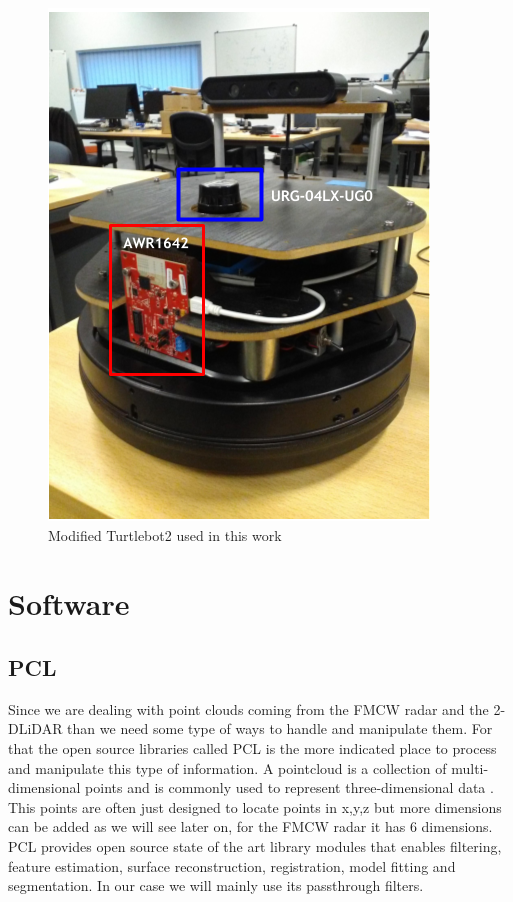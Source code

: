 \begin{figure}[h] 
\centerline{\includegraphics [width=0.5 \textwidth]{imgs/chapter4/turtlebot2.PNG}}
\caption{Modified Turtlebot2 used in this work}
\label{fig::turlebot2M}
\end{figure}


\section{Software}

\subsection{\ac{PCL}}

Since we are dealing with point clouds coming from the \ac{FMCW} \ac{radar} and the 2-D\ac{LiDAR} than we need some type of ways to handle and manipulate them. For that the open source libraries called \ac{PCL} is the more indicated place to process and manipulate this type of information. A pointcloud is a collection of multi-dimensional points and is commonly used to represent three-dimensional data \cite{pcl}. This points are often just designed to locate points in x,y,z but more dimensions can be added as we will see later on, for the FMCW radar it has 6 dimensions. \ac{PCL} provides open source state of the art library modules that enables  filtering, feature estimation, surface reconstruction, registration, model fitting and segmentation. In our case we will mainly use its passthrough filters. 



